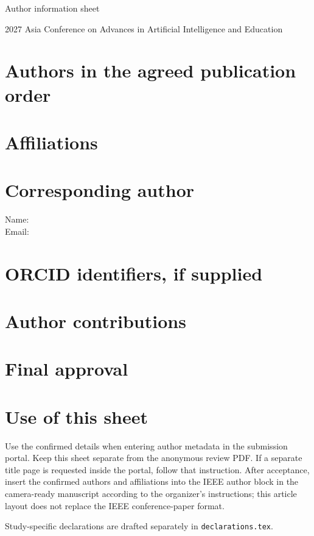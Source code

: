 \documentclass[11pt]{article}
\begin{document}
\thispagestyle{empty}
\begin{center}
{\Large\bfseries \AAIEPaperTitle\par}
\medskip
{\large Author information sheet\par}
2027 Asia Conference on Advances in Artificial Intelligence and Education
\end{center}
\AAIEDraftNotice
\section*{Authors in the agreed publication order}
\AAIEAuthors
\section*{Affiliations}
\AAIEAffiliations
\section*{Corresponding author}
Name: \AAIECorrespondingName\\
Email: \AAIECorrespondingEmail
\section*{ORCID identifiers, if supplied}
\AAIEOrcids
\section*{Author contributions}
\AAIEContributions
\section*{Final approval}
\AAIEAuthorApproval
\section*{Use of this sheet}
Use the confirmed details when entering author metadata in the submission portal.
Keep this sheet separate from the anonymous review PDF. If a separate title page
is requested inside the portal, follow that instruction. After acceptance, insert
the confirmed authors and affiliations into the IEEE author block in the
camera-ready manuscript according to the organizer's instructions; this article
layout does not replace the IEEE conference-paper format.

Study-specific declarations are drafted separately in \texttt{declarations.tex}.
\end{document}
